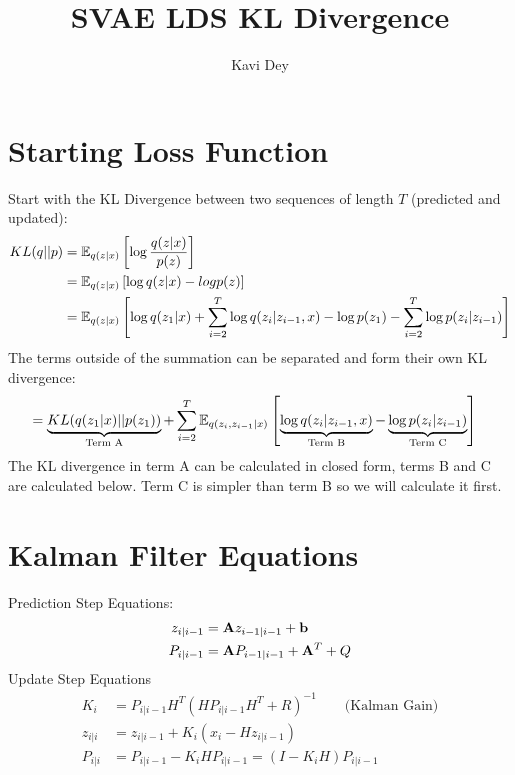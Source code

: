 \documentclass[12pt]{article}
\title{SVAE LDS KL Divergence}
\author{Kavi Dey}
\begin{document}
\maketitle

\section{Starting Loss Function}
Start with the KL Divergence between two sequences of length $T$ (predicted and updated):
\begin{align}
    KL(q||p) &= \mathbb{E}_{q(z|x)} \left[\log \frac{q(z|x)}{p(z)} \right] \\
    &= \mathbb{E}_{q(z|x)} \left[ \log q(z|x) - log p(z) \right] \\
    &= \mathbb{E}_{q(z|x)} \left[ \log q(z_1|x) + \sum_{i=2}^T \log q(z_i | z_{i-1}, x) - \log p(z_1) - \sum_{i=2}^T \log p(z_i|z_{i-1})\right]
\end{align}
The terms outside of the summation can be separated and form their own KL divergence:
\begin{align}
    &= \underbrace{KL(q(z_1|x)||p(z_1))}_\text{Term A} + \sum_{i=2}^{T} \mathbb{E}_{q(z_i,z_{i-1}|x)} \left[ \underbrace{\log q(z_i | z_{i-1}, x)}_{\text{Term B}} - \underbrace{\log p(z_i| z_{i-1})}_\text{Term C} \right]
\end{align}
The KL divergence in term A can be calculated in closed form, terms B and C are calculated below. Term C is simpler than term B so we will calculate it first.

\section{Kalman Filter Equations} \label{sec:kalman_filter}
Prediction Step Equations:
\begin{align}
    z_{i|i-1} &= \mathbf{A} z_{i-1|i-1} + \mathbf{b} \\
    P_{i|i-1} &= \mathbf{A} P_{i-1|i-1} + \mathbf{A}^T + Q \\
\end{align}
Update Step Equations
\begin{align}
    K_i  &= P_{i|i-1}H^T(HP_{i|i-1}H^T + R)^{-1} \qquad \text{(Kalman Gain)} \\
    z_{i|i} &= z_{i|i-1} + K_i (x_i - Hz_{i|i-1})  \\
    P_{i|i} &= P_{i|i-1} - K_i H P_{i|i-1} = (I-K_iH) P_{i|i-1}
\end{align}
\end{document}

